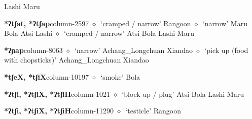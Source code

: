          Lashi 
\hspace{1ex}
         Maru 
  \item {\footnotesize \textbf{*ʔtʃat, *ʔtʃap}}{\tiny column-2597}
         $\diamond$~`cramped / narrow'
         Rangoon 
\hspace{1ex}
         $\diamond$~`narrow'
         Maru 
\hspace{1ex}
         Bola 
\hspace{1ex}
         Atsi 
\hspace{1ex}
         Lashi 
\hspace{1ex}
         $\diamond$~`cramped / narrow'
         Atsi 
\hspace{1ex}
         Bola 
\hspace{1ex}
         Lashi 
\hspace{1ex}
         Maru 
  \item {\footnotesize \textbf{*ʔɲap}}{\tiny column-8063}
         $\diamond$~`narrow'
         Achang\_Longchuan 
\hspace{1ex}
         Xiandao 
\hspace{1ex}
         $\diamond$~`pick up (food with chopsticks)'
         Achang\_Longchuan 
\hspace{1ex}
         Xiandao 
  \item {\footnotesize \textbf{*tʃeX, *tʃiX}}{\tiny column-10197}
         $\diamond$~`smoke'
         Bola 
  \item {\footnotesize \textbf{*ʔtʃi, *ʔtʃiX, *ʔtʃiH}}{\tiny column-1021}
         $\diamond$~`block up / plug'
         Atsi 
\hspace{1ex}
         Bola 
\hspace{1ex}
         Lashi 
\hspace{1ex}
         Maru 
  \item {\footnotesize \textbf{*ʔtʃi, *ʔtʃiX, *ʔtʃiH}}{\tiny column-11290}
         $\diamond$~`testicle'
         Rangoon 
